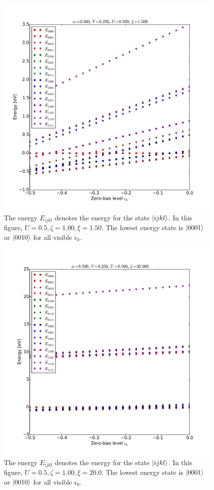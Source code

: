 \begin{figure}[!bt]
    \centering
    \includegraphics[height=.45\textheight]{pdf/energy/pespin_distribution_u3_k3.pdf}
    \caption{The energy $E_{ijkl}$ denotes the energy for the state $\ket{ijkl}$. In this figure, $U=0.5, \zeta=1.00, \xi=1.50$. The lowest energy state is $\ket{0001}$ or $\ket{0010}$ for all visible $\epsilon_0$.}
    \label{fig:perspinenergy33}
\end{figure} 
\begin{figure}[!bt]
    \centering
    \includegraphics[height=.45\textheight]{pdf/energy/pespin_distribution_u3_k4.pdf}
    \caption{The energy $E_{ijkl}$ denotes the energy for the state $\ket{ijkl}$. In this figure, $U=0.5, \zeta=1.00, \xi=20.0$. The lowest energy state is $\ket{0001}$ or $\ket{0010}$ for all visible $\epsilon_0$.}
    \label{fig:perspinenergy34}
\end{figure}


